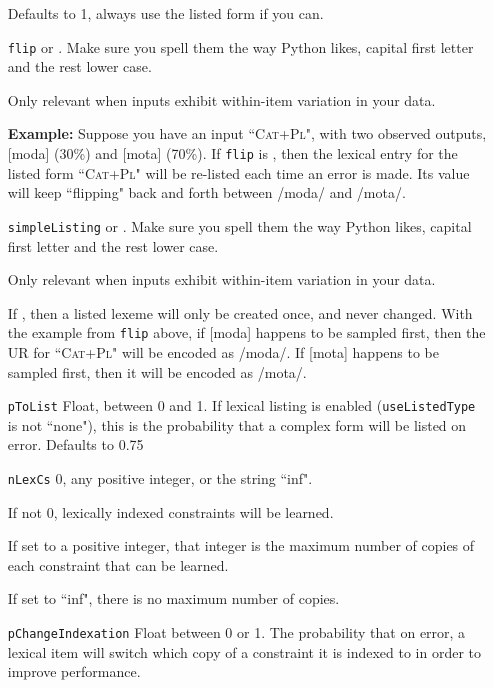 \documentclass[12]{article}
\begin{document}
\begin{itemize}
	Defaults to 1, always use the listed form if you can.
	
	\item[\texttt{flip}]   or .  Make sure you spell them the way Python likes, capital first letter and the rest lower case.
	
	Only relevant when inputs exhibit within-item variation in your data.  
	
	{\bf Example:} Suppose you have an input ``\textsc{Cat+Pl}", with two observed outputs, [moda] (30\%) and [mota] (70\%).  If \texttt{flip} is , then the lexical entry for the listed form ``\textsc{Cat+Pl}" will be re-listed each time an error is made.  Its value will keep ``flipping" back and forth between /moda/ and /mota/.
	
	\item[\texttt{simpleListing}] or .  Make sure you spell them the way Python likes, capital first letter and the rest lower case.
	
	Only relevant when inputs exhibit within-item variation in your data.  
	
	If , then a listed lexeme will only be created once, and never changed.  With the example from \texttt{flip} above, if [moda] happens to be sampled first, then the UR for ``\textsc{Cat+Pl}" will be encoded as /moda/.  If [mota] happens to be sampled first, then it will be encoded as /mota/.
	
	\item[\texttt{pToList}]  Float, between 0 and 1.  If lexical listing is enabled (\texttt{useListedType} is not ``none"), this is the probability that a complex form will be listed on error.  Defaults to 0.75
	
	\item[\texttt{nLexCs}] 0, any positive integer, or the string ``inf".  
	
	If not 0, lexically indexed constraints will be learned.
	
	If set to a positive integer, that integer is the maximum number of copies of each constraint that can be learned.
	
	If set to ``inf", there is no maximum number of copies.
	
	\item[\texttt{pChangeIndexation}] Float between 0 or 1.  The probability that on error, a lexical item will switch which copy of a constraint it is indexed to in order to improve performance.
	

\end{itemize}
\end{document}
